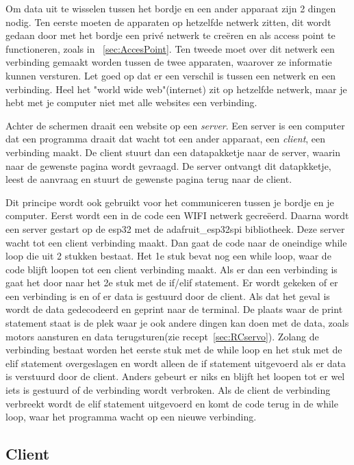 		Om data uit te wisselen tussen het bordje en een ander apparaat zijn 2 dingen nodig. Ten eerste moeten de apparaten op hetzelfde netwerk zitten, dit wordt gedaan door met het bordje een priv\'e netwerk te cre\"eren en als access point te functioneren, zoals in ~\ref{sec:AccesPoint}. Ten tweede moet over dit netwerk een verbinding gemaakt worden tussen de twee apparaten, waarover ze informatie kunnen versturen. Let goed op dat er een verschil is tussen een netwerk en een verbinding. Heel het "world wide web"(internet) zit op hetzelfde netwerk, maar je hebt met je computer niet met alle websites een verbinding. 
		
		Achter de schermen draait een website op een \textit{server}. Een server is een computer dat een programma draait dat wacht tot een ander apparaat, een \textit{client}, een verbinding maakt. De client stuurt dan een datapakketje naar de server, waarin naar de gewenste pagina wordt gevraagd. De server ontvangt dit datapkketje, leest de aanvraag en stuurt de gewenste pagina terug naar de client.
		
		Dit principe wordt ook gebruikt voor het communiceren tussen je bordje en je computer. Eerst wordt een in de code een WIFI netwerk gecre\"eerd. Daarna wordt een server gestart op de esp32 met de adafruit\_esp32spi bibliotheek. Deze server wacht tot een client verbinding maakt. Dan gaat de code naar de oneindige while loop die uit 2 stukken bestaat. Het 1e stuk bevat nog een while loop, waar de code blijft loopen tot een client verbinding maakt. Als er dan een verbinding is gaat het door naar het 2e stuk met de if/elif statement. Er wordt gekeken of er een verbinding is en of er data is gestuurd door de client. Als dat het geval is wordt de data gedecodeerd en geprint naar de terminal. De plaats waar de print statement staat is de plek waar je ook andere dingen kan doen met de data, zoals motors aansturen en data terugsturen(zie recept~\ref{sec:RCservo}). Zolang de verbinding bestaat worden het eerste stuk met de while loop en het stuk met de elif statement overgeslagen en wordt alleen de if statement uitgevoerd als er data is verstuurd door de client. Anders gebeurt er niks en blijft het loopen tot er wel iets is gestuurd of de verbinding wordt verbroken. Als de client de verbinding verbreekt wordt de elif statement uitgevoerd en komt de code terug in de while loop, waar het programma wacht op een nieuwe verbinding.


\newpage
\subsection{Client}
